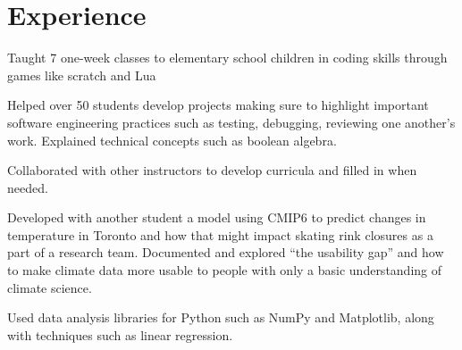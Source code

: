 \documentclass[letterpaper,10pt]{article}
\begin{document}
    \section{Experience}
    \begin{resume_list}
        \item Taught 7 one-week classes to elementary school children in coding skills through games like scratch and Lua
        \item Helped over 50 students develop projects making sure to highlight important software engineering practices
        such as testing, debugging, reviewing one another's work. Explained technical concepts such as boolean algebra. 
        \item Collaborated with other instructors to develop curricula and filled in when needed.
    \end{resume_list}

    \begin{resume_list}
        \item Developed with another student a model using CMIP6 to predict changes in temperature in Toronto and how that might impact
        skating rink closures as a part of a research team. Documented and explored ``the usability gap'' and how to make climate data more usable to people with only a basic understanding of climate science.
        \item Used data analysis libraries for Python such as NumPy and Matplotlib, along with techniques such as linear regression.
    \end{resume_list}
    
\end{document}

